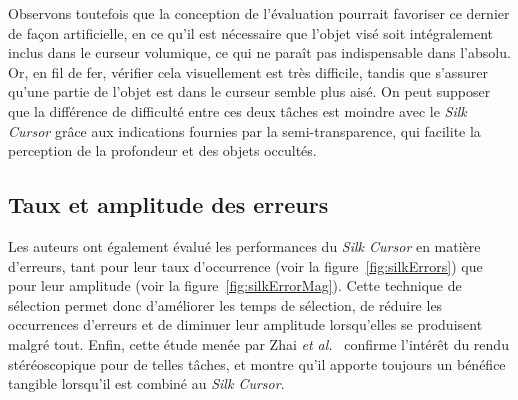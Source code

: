 \begin{appendices}
	Observons toutefois que la conception de l'évaluation pourrait favoriser ce dernier de façon artificielle, en ce qu'il est nécessaire que l'objet visé soit intégralement inclus dans le curseur volumique, ce qui ne paraît pas indispensable dans l'absolu. Or, en fil de fer, vérifier cela visuellement est très difficile, tandis que s'assurer qu'une partie de l'objet est dans le curseur semble plus aisé. On peut supposer que la différence de difficulté entre ces deux tâches est moindre avec le \emph{Silk Cursor} grâce aux indications fournies par la semi-transparence, qui facilite la perception de la profondeur et des objets occultés.
	
	\subsection{Taux et amplitude des erreurs}
	Les auteurs ont également évalué les performances du \emph{Silk Cursor} en matière d'erreurs, tant pour leur taux d'occurrence (voir la figure~\ref{fig:silkErrors}) que pour leur amplitude (voir la figure~\ref{fig:silkErrorMag}). Cette technique de sélection permet donc d'améliorer les temps de sélection, de réduire les occurrences d'erreurs et de diminuer leur amplitude lorsqu'elles se produisent malgré tout. Enfin, cette étude menée par Zhai \emph{et al.}~\cite{zhai1994silk} confirme l'intérêt du rendu stéréoscopique pour de telles tâches, et montre qu'il apporte toujours un bénéfice tangible lorsqu'il est combiné au \emph{Silk Cursor}.
	

\end{appendices}
